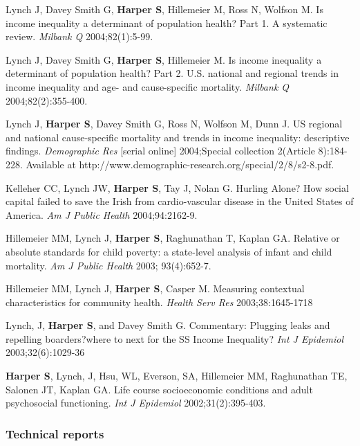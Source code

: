 \documentclass[
  letterpaper,
  DIV=11,
  numbers=noendperiod]{scrartcl}
\begin{document}
\begin{etaremune}
\item Lynch J, Davey Smith G, \textbf{Harper S}, Hillemeier M, Ross N, Wolfson M. Is income inequality a determinant of population health? Part 1. A systematic review. \emph{Milbank Q} 2004;82(1):5-99.
 
\item Lynch J, Davey Smith G, \textbf{Harper S}, Hillemeier M.  Is income inequality a determinant of population health? Part 2. U.S. national and regional trends in income inequality and age- and cause-specific mortality. \emph{Milbank Q} 2004;82(2):355-400.
 
\item Lynch J, \textbf{Harper S}, Davey Smith G, Ross N, Wolfson M, Dunn J. US regional and national cause-specific mortality and trends in income inequality: descriptive findings. \emph{Demographic Res} [serial online] 2004;Special collection 2(Article 8):184-228. Available at http://www.demographic-research.org/special/2/8/s2-8.pdf.
 
\item Kelleher CC, Lynch JW, \textbf{Harper S}, Tay J, Nolan G.  Hurling Alone? How social capital failed to save the Irish from cardio-vascular disease in the United States of America.  \emph{Am J Public Health} 2004;94:2162-9.
 
\item Hillemeier MM, Lynch J, \textbf{Harper S}, Raghunathan T, Kaplan GA. Relative or absolute standards for child poverty: a state-level analysis of infant and child mortality. \emph{Am J Public Health} 2003; 93(4):652-7.
 
\item Hillemeier MM, Lynch J, \textbf{Harper S}, Casper M. Measuring contextual characteristics for community health.  \emph{Health Serv Res} 2003;38:1645-1718 
 
\item Lynch, J, \textbf{Harper S}, and Davey Smith G. Commentary: Plugging leaks and repelling boarders?where to next for the SS Income Inequality? \emph{Int J Epidemiol} 2003;32(6):1029-36

\item \textbf{Harper S}, Lynch, J, Hsu, WL, Everson, SA, Hillemeier MM, Raghunathan TE, Salonen JT,  Kaplan GA. Life course socioeconomic conditions and adult psychosocial functioning. \emph{Int J Epidemiol} 2002;31(2):395-403.

\end{etaremune}

\subsubsection{Technical reports}\label{technical-reports}
\end{document}
